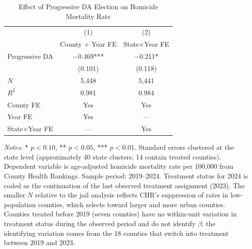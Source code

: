 \documentclass[12pt]{article}
\begin{document}
\begin{table}[H]
\centering
\caption{Effect of Progressive DA Election on Homicide Mortality Rate}
\label{tab:homicide}
\begin{threeparttable}
\begin{tabular}{lcc}
\toprule
& (1) & (2) \\
& County + Year FE & State$\times$Year FE \\
\midrule
Progressive DA & $-$0.469*** & $-$0.211* \\
& (0.101) & (0.118) \\
\midrule
$N$ & 5,448 & 5,441 \\
$R^2$ & 0.981 & 0.984 \\
County FE & Yes & Yes \\
Year FE & Yes & --- \\
State$\times$Year FE & --- & Yes \\
\bottomrule
\end{tabular}
\begin{tablenotes}[flushleft]
\small
\item \textit{Notes:} * $p<0.10$, ** $p<0.05$, *** $p<0.01$. Standard errors clustered at the state level (approximately 40 state clusters; 14 contain treated counties). Dependent variable is age-adjusted homicide mortality rate per 100,000 from County Health Rankings. Sample period: 2019--2024. Treatment status for 2024 is coded as the continuation of the last observed treatment assignment (2023). The smaller $N$ relative to the jail analysis reflects CHR's suppression of rates in low-population counties, which selects toward larger and more urban counties. Counties treated before 2019 (seven counties) have no within-unit variation in treatment status during the observed period and do not identify $\beta$; the identifying variation comes from the 18 counties that switch into treatment between 2019 and 2023.
\end{tablenotes}
\end{threeparttable}
\end{table}
\end{document}
